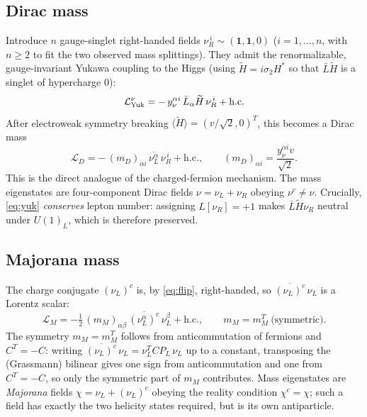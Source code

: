 \documentclass[12pt]{article}
\theoremstyle{definition}
\newcommand{\nuL}{\nu_L}
\newcommand{\nuR}{\nu_R}
\newcommand{\PL}{P_L}
\begin{document}
\subsection{Dirac mass}
Introduce $n$ gauge-singlet right-handed fields
$\nuR^{\,i}\sim(\mathbf1,\mathbf1,0)$ ($i=1,\dots,n$, with $n\ge2$ to fit
the two observed mass splittings). They admit the renormalizable,
gauge-invariant Yukawa coupling to the Higgs (using
$\widetilde H=i\sigma_2 H^*$ so that $\bar L\widetilde H$ is a singlet of
hypercharge $0$):
\begin{equation}\label{eq:yuk}
\mathcal L_{\rm Yuk}^{\nu}
=-\,y^{\alpha i}_\nu\,\bar L_\alpha \widetilde H\,\nuR^{\,i}
+\text{h.c.}
\end{equation}
After electroweak symmetry breaking $\langle\widetilde
H\rangle=(v/\sqrt2,0)^T$, this becomes a Dirac mass
\begin{equation}\label{eq:Dirac}
\mathcal L_D
=-\,(m_D)_{\alpha i}\,\overline{\nuL^{\alpha}}\,\nuR^{\,i}
+\text{h.c.},\qquad (m_D)_{\alpha i}=\frac{y^{\alpha i}_\nu v}{\sqrt2}.
\end{equation}
This is the direct analogue of the charged-fermion mechanism. The mass
eigenstates are four-component Dirac fields
$\nu=\nuL+\nuR$ obeying $\nu^c\neq\nu$. Crucially, \eqref{eq:yuk}
\emph{conserves} lepton number: assigning $L[\nuR]=+1$ makes
$\bar L\widetilde H\nuR$ neutral under $U(1)_L$, which is therefore
preserved.

\subsection{Majorana mass}
The charge conjugate $(\nuL)^c$ is, by \eqref{eq:flip}, right-handed, so
$\overline{(\nuL)^c}\,\nuL$ is a Lorentz scalar:
\begin{equation}\label{eq:Majorana}
\mathcal L_M=-\tfrac12\,(m_M)_{\alpha\beta}\,
\overline{(\nuL^{\alpha})^c}\,\nuL^{\beta}+\text{h.c.},
\qquad m_M=m_M^T\ \text{(symmetric)}.
\end{equation}
The symmetry $m_M=m_M^T$ follows from anticommutation of fermions and
$C^T=-C$: writing $\overline{(\nuL)^c}\,\nuL=\nuL^T C\PL \,\nuL$ up to a
constant, transposing the (Grassmann) bilinear gives one sign from
anticommutation and one from $C^T=-C$, so only the symmetric part of
$m_M$ contributes. Mass eigenstates are \emph{Majorana} fields
$\chi=\nuL+(\nuL)^c$ obeying the reality condition $\chi^c=\chi$; such a
field has exactly the two helicity states required, but is its own
antiparticle.
\end{document}
